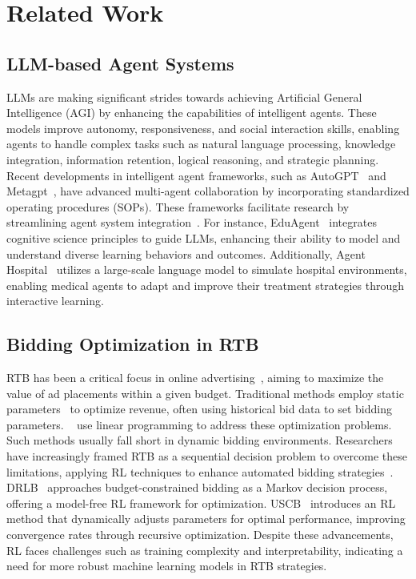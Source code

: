 \section{Related Work}
\subsection{LLM-based Agent Systems}
LLMs are making significant strides towards achieving Artificial General Intelligence (AGI) by enhancing the capabilities of intelligent agents. These models improve autonomy, responsiveness, and social interaction skills, enabling agents to handle complex tasks such as natural language processing, knowledge integration, information retention, logical reasoning, and strategic planning. Recent developments in intelligent agent frameworks, such as AutoGPT~\cite{yang2023auto} and Metagpt~\cite{hong2023metagpt}, have advanced multi-agent collaboration by incorporating standardized operating procedures (SOPs). These frameworks facilitate research by streamlining agent system integration~\cite{huang2023agentcoder,gur2023real,xu2024eduagent,li2024agent,zhang2024finagent}. For instance, EduAgent~\cite{xu2024eduagent} integrates cognitive science principles to guide LLMs, enhancing their ability to model and understand diverse learning behaviors and outcomes. Additionally, Agent Hospital~\cite{li2024agent} utilizes a large-scale language model to simulate hospital environments, enabling medical agents to adapt and improve their treatment strategies through interactive learning.  

\subsection{Bidding Optimization in RTB}
RTB has been a critical focus in online advertising~\cite{wang2015real}, aiming to maximize the value of ad placements within a given budget. Traditional methods employ static parameters~\cite{perlich2012bid,yu2017online,yu2020low} to optimize revenue, often using historical bid data to set bidding parameters. ~\cite{yu2020low} use linear programming to address these optimization problems. Such methods usually fall short in dynamic bidding environments. Researchers have increasingly framed RTB as a sequential decision problem to overcome these limitations, applying RL techniques to enhance automated bidding strategies~\cite{cai2017real,zhao2018deep,wu2018budget,he2021unified}. DRLB~\cite{wu2018budget} approaches budget-constrained bidding as a Markov decision process, offering a model-free RL framework for optimization. USCB~\cite{he2021unified} introduces an RL method that dynamically adjusts parameters for optimal performance, improving convergence rates through recursive optimization. Despite these advancements, RL faces challenges such as training complexity and interpretability, indicating a need for more robust machine learning models in RTB strategies.